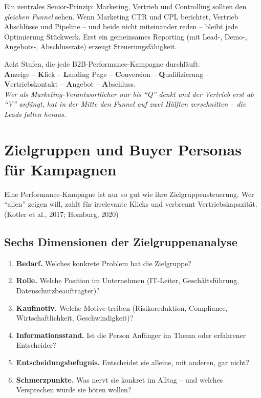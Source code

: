 \documentclass[11pt,a4paper,oneside]{article}
\newcommand{\caveatfontfallback}{\itshape}
\newcommand\caveatfont{\caveatfontfallback}%
\newcommand{\akzent}[1]{{\caveatfont\color{lpAmber}#1}}
\newcommand{\fachbegriff}[1]{\textbf{#1}}
\newcommand{\quelle}[1]{{\footnotesize\color{lpGray}(#1)}}
\begin{document}
Ein zentrales Senior-Prinzip: Marketing, Vertrieb und Controlling sollten den \emph{gleichen Funnel} sehen. Wenn Marketing CTR und CPL berichtet, Vertrieb Abschlüsse und Pipeline -- und beide nicht miteinander reden -- bleibt jede Optimierung Stückwerk. Erst ein gemeinsames Reporting (mit Lead-, Demo-, Angebots-, Abschlussrate) erzeugt Steuerungsfähigkeit.

\begin{eselsbox}[Eselsbrücke: \akzent{A-K-L-C-Q-V-A-A}]
Acht Stufen, die jede B2B-Performance-Kampagne durchläuft:\\[2pt]
\textbf{A}nzeige -- \textbf{K}lick -- \textbf{L}anding Page -- \textbf{C}onversion -- \textbf{Q}ualifizierung -- \textbf{V}ertriebskontakt -- \textbf{A}ngebot -- \textbf{A}bschluss.\\[2pt]
\emph{Wer als Marketing-Verantwortlicher nur bis ``Q'' denkt und der Vertrieb erst ab ``V'' anfängt, hat in der Mitte den Funnel auf zwei Hälften zerschnitten -- die Leads fallen heraus.}
\end{eselsbox}

\section{Zielgruppen und Buyer Personas für Kampagnen}

Eine Performance-Kampagne ist nur so gut wie ihre Zielgruppensteuerung. Wer ``allen'' zeigen will, zahlt für irrelevante Klicks und verbrennt Vertriebskapazität. \quelle{Kotler et al., 2017; Homburg, 2020}

\subsection{Sechs Dimensionen der Zielgruppenanalyse}

\begin{enumerate}
  \item \fachbegriff{Bedarf.} Welches konkrete Problem hat die Zielgruppe?
  \item \fachbegriff{Rolle.} Welche Position im Unternehmen (IT-Leiter, Geschäftsführung, Datenschutzbeauftragter)?
  \item \fachbegriff{Kaufmotiv.} Welche Motive treiben (Risikoreduktion, Compliance, Wirtschaftlichkeit, Geschwindigkeit)?
  \item \fachbegriff{Informationsstand.} Ist die Person Anfänger im Thema oder erfahrener Entscheider?
  \item \fachbegriff{Entscheidungsbefugnis.} Entscheidet sie alleine, mit anderen, gar nicht?
  \item \fachbegriff{Schmerzpunkte.} Was nervt sie konkret im Alltag -- und welches Versprechen würde sie hören wollen?
\end{enumerate}
\end{document}
